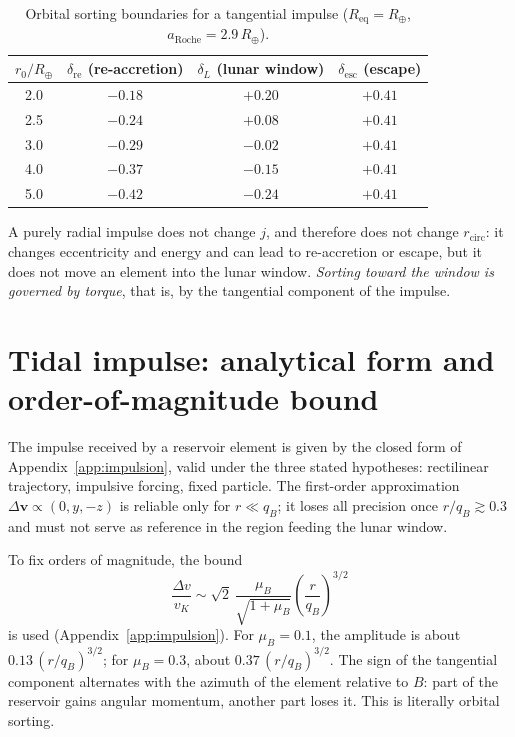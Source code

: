 \documentclass[11pt,a4paper,openany]{report}
\newcommand{\Rt}{R_{\oplus}}
\newcommand{\Req}{R_{\mathrm{eq}}}
\newcommand{\aR}{a_{\mathrm{Roche}}}
\begin{document}
\begin{table}[htbp]
\centering
\small
\caption{Orbital sorting boundaries for a tangential impulse ($\Req=\Rt$, $\aR=2.9\,\Rt$).}
\label{tab:frontieres}
\begin{tabular}{cccc}
\toprule
$r_0/\Rt$ & $\delta_{\mathrm{re}}$ (re-accretion) & $\delta_L$ (lunar window) & $\delta_{\mathrm{esc}}$ (escape) \\
\midrule
2.0 & $-0.18$ & $+0.20$ & $+0.41$ \\
2.5 & $-0.24$ & $+0.08$ & $+0.41$ \\
3.0 & $-0.29$ & $-0.02$ & $+0.41$ \\
4.0 & $-0.37$ & $-0.15$ & $+0.41$ \\
5.0 & $-0.42$ & $-0.24$ & $+0.41$ \\
\bottomrule
\end{tabular}
\end{table}

A purely radial impulse does not change $j$, and therefore does not change $r_{\mathrm{circ}}$: it
changes eccentricity and energy and can lead to re-accretion or escape, but it does not move an
element into the lunar window. \emph{Sorting toward the window is governed by torque}, that is, by
the tangential component of the impulse.

\section{Tidal impulse: analytical form and order-of-magnitude bound}

The impulse received by a reservoir element is given by the closed form of
Appendix~\ref{app:impulsion}, valid under the three stated hypotheses: rectilinear trajectory,
impulsive forcing, fixed particle. The first-order approximation
$\Delta\mathbf{v}\propto(0,y,-z)$ is reliable only for $r\ll q_B$; it loses all precision once
$r/q_B\gtrsim0.3$ and must not serve as reference in the region feeding the lunar window.

To fix orders of magnitude, the bound
\begin{equation}
\frac{\Delta v}{v_K}\sim\sqrt2\,\frac{\mu_B}{\sqrt{1+\mu_B}}
\left(\frac{r}{q_B}\right)^{3/2}
\label{eq:impulsion}
\end{equation}
is used (Appendix~\ref{app:impulsion}). For $\mu_B=0.1$, the amplitude is about
$0.13\,(r/q_B)^{3/2}$; for $\mu_B=0.3$, about $0.37\,(r/q_B)^{3/2}$. The sign of the tangential
component alternates with the azimuth of the element relative to $B$: part of the reservoir gains
angular momentum, another part loses it. This is literally orbital sorting.
\end{document}

